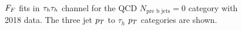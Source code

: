 \begin{figure}[!hbtp]
\centering
     \\
\caption[Plots of the fake factor fits in the $\tauh\tauh$ channel.]{$F_{F}$ fits in $\tauh\tauh$ channel for the QCD $N_{\text{pre b jets}}=0$ category with 2018 data. The three jet $p_{T}$ to $\tau_h$ $p_{T}$ categories are shown.}
\label{fig:tt_ff_fit}
\end{figure}


